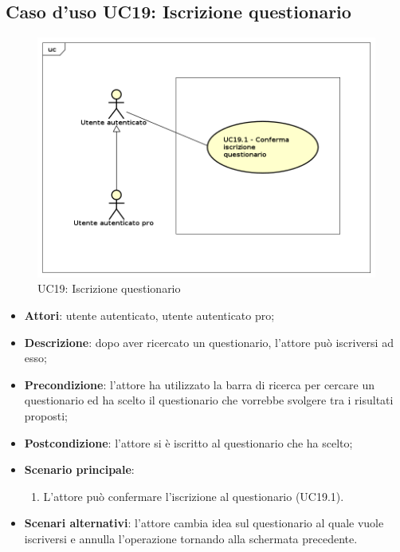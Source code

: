 \newpage
\subsection{Caso d'uso UC19: Iscrizione questionario}
\label{UC19}
\begin{figure}[ht]
\centering
\includegraphics[scale=0.5,keepaspectratio]{UML/UC19.png}
\caption{UC19: Iscrizione questionario}
\end{figure}
\FloatBarrier
\begin{itemize}
\item\textbf{Attori}: utente autenticato, utente autenticato pro;
\item\textbf{Descrizione}: dopo aver ricercato un questionario, l'attore può iscriversi ad esso;
\item\textbf{Precondizione}: l'attore ha utilizzato la barra di ricerca per cercare un questionario ed ha scelto il questionario che vorrebbe svolgere tra i risultati proposti;
\item\textbf{Postcondizione}: l'attore si è iscritto al questionario che ha scelto;
\item\textbf{Scenario principale}:
\begin{enumerate}
\item L'attore può confermare l'iscrizione al questionario (UC19.1).
\end{enumerate} 
\item\textbf{Scenari alternativi}: l'attore cambia idea sul questionario al quale vuole iscriversi e annulla l'operazione tornando alla schermata precedente.
\end{itemize}

